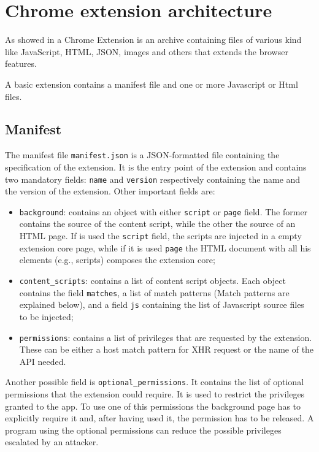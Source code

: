 \section{Chrome extension architecture}
\label{sec:ExtDetails}
As showed in \cite{ChromeExtensionOnline} a Chrome Extension is an archive containing files of various kind like JavaScript, HTML, JSON, images and others that extends the browser features.

A basic extension contains a manifest file and one or more Javascript or Html files.

\subsection{Manifest}
The manifest file \texttt{manifest.json} is a JSON-formatted file containing the specification of the extension. It is the entry point of the extension and contains two mandatory fields: \texttt{name} and \texttt{version} respectively containing the name and the version of the extension. Other important fields are:
\begin{itemize}
\item \texttt{background}: contains an object with either \texttt{script} or \texttt{page} field. The former contains the source of the content script, while the other the source of an HTML page. If is used the \texttt{script} field, the scripts are injected in a empty extension core page, while if it is used \texttt{page} the HTML document with all his elements (e.g., scripts) composes the extension core;
\item \texttt{content\_scripts}: contains a list of content script objects. Each object contains the field \texttt{matches}, a list of match patterns (Match patterns are explained below), and a field \texttt{js} containing the list of Javascript source files to be injected;
\item \texttt{permissions}: contains a list of privileges that are requested by the extension. These can be either a host match pattern for XHR request or the name of the API needed.
\end{itemize}

Another possible field is \texttt{optional\_permissions}. It contains the list of optional permissions that the extension could require. It is used to restrict the privileges granted to the app. To use one of this permissions the background page has to explicitly require it and, after having used it, the permission has to be released. A program using the optional permissions can reduce the possible privileges escalated by an attacker.

